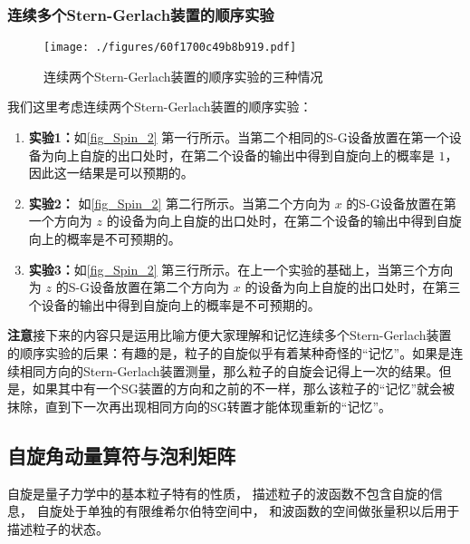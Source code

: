 \subsubsection{连续多个Stern-Gerlach装置的顺序实验}
\begin{figure}[ht]
\centering
\texttt{[image: ./figures/60f1700c49b8b919.pdf]}
\caption{连续两个Stern-Gerlach装置的顺序实验的三种情况} \label{fig_Spin_2}
\end{figure}
我们这里考虑连续两个Stern-Gerlach装置的顺序实验：
\begin{enumerate}
\item \textbf{实验1：}如\autoref{fig_Spin_2} 第一行所示。当第二个相同的S-G设备放置在第一个设备为向上自旋的出口处时，在第二个设备的输出中得到自旋向上的概率是 $1$，因此这一结果是可以预期的。

\item  \textbf{实验2：} 如\autoref{fig_Spin_2} 第二行所示。当第二个方向为 $x$ 的S-G设备放置在第一个方向为 $z$ 的设备为向上自旋的出口处时，在第二个设备的输出中得到自旋向上的概率是不可预期的。

\item  \textbf{实验3：}如\autoref{fig_Spin_2} 第三行所示。在上一个实验的基础上，当第三个方向为 $z$ 的S-G设备放置在第二个方向为 $x$ 的设备为向上自旋的出口处时，在第三个设备的输出中得到自旋向上的概率是不可预期的。
\end{enumerate}

\textbf{注意}接下来的内容只是运用比喻方便大家理解和记忆连续多个Stern-Gerlach装置的顺序实验的后果：有趣的是，粒子的自旋似乎有着某种奇怪的“记忆”。如果是连续相同方向的Stern-Gerlach装置测量，那么粒子的自旋会记得上一次的结果。但是，如果其中有一个SG装置的方向和之前的不一样，那么该粒子的“记忆”就会被抹除，直到下一次再出现相同方向的SG转置才能体现重新的“记忆”。

\subsection{自旋角动量算符与泡利矩阵}

自旋是量子力学中的基本粒子特有的性质， 描述粒子的波函数不包含自旋的信息， 自旋处于单独的有限维希尔伯特空间中， 和波函数的空间做张量积以后用于描述粒子的状态。


